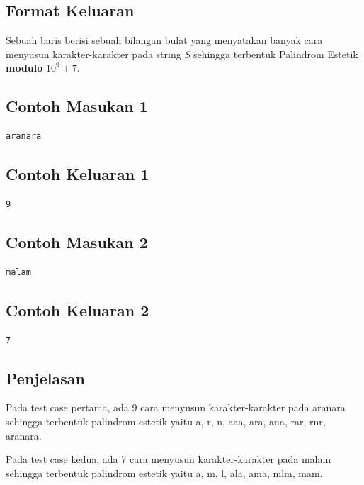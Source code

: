 \documentclass{article}
\begin{document}
\subsection*{Format Keluaran}
Sebuah baris berisi sebuah bilangan bulat yang menyatakan banyak cara menyusun karakter-karakter pada string \textit{S} sehingga terbentuk Palindrom Estetik \textbf{modulo} $10^9 + 7$.

\begin{multicols}{2}
\subsection*{Contoh Masukan 1}
\begin{lstlisting}
aranara
\end{lstlisting}
\columnbreak

\subsection*{Contoh Keluaran 1}
\begin{lstlisting}
9
\end{lstlisting}
\vfill
\null
\end{multicols}

\begin{multicols}{2}
\subsection*{Contoh Masukan 2}
\begin{lstlisting}
malam
\end{lstlisting}
\columnbreak

\subsection*{Contoh Keluaran 2}
\begin{lstlisting}
7
\end{lstlisting}
\vfill
\null
\end{multicols}

\subsection*{Penjelasan}
Pada test case pertama, ada 9 cara menyusun karakter-karakter pada aranara sehingga terbentuk palindrom estetik yaitu a, r, n, aaa, ara, ana, rar, rnr, aranara.

Pada test case kedua, ada 7 cara menyusun karakter-karakter pada malam sehingga terbentuk palindrom estetik yaitu a, m, l, ala, ama, mlm, mam.
\end{document}
